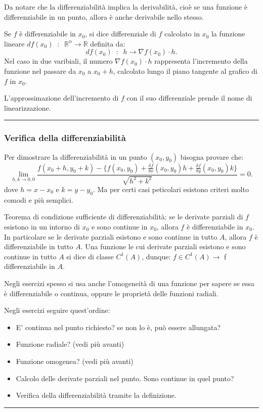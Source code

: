 Da notare che la differenziabilità implica la derivabilità, cioè se una funzione è differenziabile in un punto, allora è anche derivabile nello stesso.\newline

Se $f$ è differenziabile in $x_0$, si dice differenziale di $f$ calcolato in $x_0$ la funzione lineare $df(x_0) \;\;:\;\; \mathbb{R}^n \rightarrow  \mathbb{R}$ definita da:
\[
    df(x_0) \;\;:\;\;h \rightarrow  \nabla f(x_0) \cdot h.
\] 
Nel caso in due varibiali, il numero $\nabla f(x_0) \cdot h$ rappresenta l'incremento della funzione nel passare da $x_0$ a $x_0+h$, calcolato lungo il piano tangente al grafico di $f$ in $x_0$.\newline

L'approssimazione dell'incremento di $f$ con il suo differenziale prende il nome di linearizzazione.\newline
\rule{\textwidth}{0.4pt}
\subsubsection*{Verifica della differenziabilità}
Per dimostrare la differenziabilità in un punto $(x_0,y_0)$ bisogna provare che:
\[
    \lim_{h,k\rightarrow 0,0}\frac{f(x_0+h, y_0+k)-\{
        f(x_0,y_0)+ \frac{\delta f}{\delta x}(x_0,y_0) h + \frac{\delta f}{\delta y}(x_0,y_0)k
        \}}{\sqrt{h^2+k^2}} =0.
\]
dove $h = x-x_0$ e $k = y-y_0$.\newline
Ma per certi casi peticolari esistono criteri molto comodi e più semplici.\newline

Teorema di condizione sufficiente di differenziabilità: se le derivate parziali di $f$ esistono in un intorno di $x_0$ e sono continue in $x_0$, allora $f$ è differenziabile in $x_0$.\newline
In particolare se le derivate parziali esistono e sono continue in tutto $A$, allora $f$ è differenziabile in tutto $A$.\newline
Una funzione le cui derivate parziali esistono e sono continue in tutto $A$ si dice di classe $C^1(A)$, dunque: $f \in C^1(A) \rightarrow$ f differenziabile in $A$. \newline

Negli esercizi spesso si usa anche l'omogeneità di una funzione per sapere se essa è differenziabile o continua, oppure le proprietà delle funzioni radiali.\newline

Negli esercizi seguire quest'ordine:
\begin{itemize}
    \item E' continua nel punto richiesto? se non lo è, può essere allungata?
    \item Funzione radiale? (vedi più avanti)
    \item Funzione omogenea? (vedi più avanti)
    \item Calcolo delle derivate parziali nel punto. Sono continue in quel punto?
    \item Verifica della differenziabilità tramite la definizione.
\end{itemize}
\rule{\textwidth}{0.4pt}
